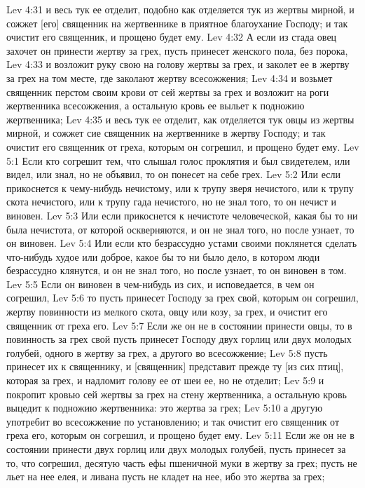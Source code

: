 Lev 4:31  и весь тук ее отделит, подобно как отделяется тук из жертвы мирной, и сожжет [его] священник на жертвеннике в приятное благоухание Господу; и так очистит его священник, и прощено будет ему.
Lev 4:32  А если из стада овец захочет он принести жертву за грех, пусть принесет женского пола, без порока,
Lev 4:33  и возложит руку свою на голову жертвы за грех, и заколет ее в жертву за грех на том месте, где заколают жертву всесожжения;
Lev 4:34  и возьмет священник перстом своим крови от сей жертвы за грех и возложит на роги жертвенника всесожжения, а остальную кровь ее выльет к подножию жертвенника;
Lev 4:35  и весь тук ее отделит, как отделяется тук овцы из жертвы мирной, и сожжет сие священник на жертвеннике в жертву Господу; и так очистит его священник от греха, которым он согрешил, и прощено будет ему.
Lev 5:1  Если кто согрешит тем, что слышал голос проклятия и был свидетелем, или видел, или знал, но не объявил, то он понесет на себе грех.
Lev 5:2  Или если прикоснется к чему-нибудь нечистому, или к трупу зверя нечистого, или к трупу скота нечистого, или к трупу гада нечистого, но не знал того, то он нечист и виновен.
Lev 5:3  Или если прикоснется к нечистоте человеческой, какая бы то ни была нечистота, от которой оскверняются, и он не знал того, но после узнает, то он виновен.
Lev 5:4  Или если кто безрассудно устами своими поклянется сделать что-нибудь худое или доброе, какое бы то ни было дело, в котором люди безрассудно клянутся, и он не знал того, но после узнает, то он виновен в том.
Lev 5:5  Если он виновен в чем-нибудь из сих, и исповедается, в чем он согрешил,
Lev 5:6  то пусть принесет Господу за грех свой, которым он согрешил, жертву повинности из мелкого скота, овцу или козу, за грех, и очистит его священник от греха его.
Lev 5:7  Если же он не в состоянии принести овцы, то в повинность за грех свой пусть принесет Господу двух горлиц или двух молодых голубей, одного в жертву за грех, а другого во всесожжение;
Lev 5:8  пусть принесет их к священнику, и [священник] представит прежде ту [из сих птиц], которая за грех, и надломит голову ее от шеи ее, но не отделит;
Lev 5:9  и покропит кровью сей жертвы за грех на стену жертвенника, а остальную кровь выцедит к подножию жертвенника: это жертва за грех;
Lev 5:10  а другую употребит во всесожжение по установлению; и так очистит его священник от греха его, которым он согрешил, и прощено будет ему.
Lev 5:11  Если же он не в состоянии принести двух горлиц или двух молодых голубей, пусть принесет за то, что согрешил, десятую часть ефы пшеничной муки в жертву за грех; пусть не льет на нее елея, и ливана пусть не кладет на нее, ибо это жертва за грех;
